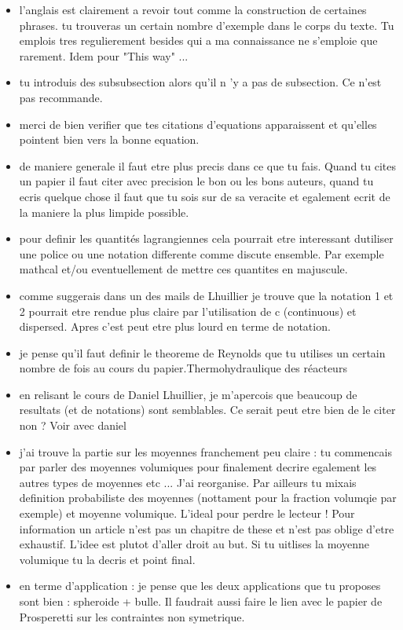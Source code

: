 \documentclass[12pt]{My_preprint}
\newcommand{\tb}[1]{\color{blue}#1\color{black}}
\begin{document}
{\begin{itemize}
\item l'anglais est clairement a revoir tout comme la construction de certaines phrases. tu trouveras un certain nombre d'exemple dans le corps du texte. Tu emplois tres regulierement besides qui a ma connaissance ne s'emploie que rarement. Idem pour "This way" ...
\item tu introduis des subsubsection alors qu'il n 'y a pas de subsection. Ce n'est pas recommande.
\item merci de bien verifier que tes citations d'equations apparaissent et qu'elles pointent bien vers la bonne equation.
\item de maniere generale il faut etre plus precis dans ce que tu fais. Quand tu cites un papier il faut citer avec precision le bon ou les bons auteurs, quand tu ecris quelque chose il faut que tu sois sur de sa veracite et egalement ecrit de la maniere la plus limpide possible.
\item pour definir les quantités lagrangiennes cela pourrait etre interessant dutiliser une police ou une notation differente comme discute ensemble. Par exemple mathcal et/ou eventuellement de mettre ces quantites en majuscule.
\item comme suggerais dans un des mails de Lhuillier je trouve que la notation 1 et 2 pourrait etre rendue plus claire par l'utilisation de c (continuous) et dispersed. Apres c'est peut etre plus lourd en terme de notation.
\item je pense qu'il faut definir le theoreme de Reynolds que tu utilises un certain nombre de fois au cours du papier.\tb{Thermohydraulique des réacteurs}
\item en relisant le cours de Daniel Lhuillier, je m'apercois que beaucoup de resultats (et de notations) sont semblables. Ce serait peut etre bien de le citer non ?
\tb{Voir avec daniel }
\item j'ai trouve la partie sur les moyennes franchement peu claire : tu commencais par parler des moyennes volumiques pour finalement decrire egalement les autres types de moyennes etc ... J'ai reorganise. Par ailleurs tu mixais definition probabiliste des moyennes (nottament pour la fraction volumqie par exemple) et moyenne volumique. L'ideal pour perdre le lecteur ! Pour information un article n'est pas un chapitre de these et n'est pas oblige d'etre exhaustif. L'idee est plutot d'aller droit au but. Si tu uitlises la moyenne volumique tu la decris et point final.
\item en terme d'application : je pense que les deux applications que tu proposes sont bien : spheroide + bulle. Il faudrait aussi faire le lien avec le papier de Prosperetti sur les contraintes non symetrique.

\end{itemize}}
\end{document}
